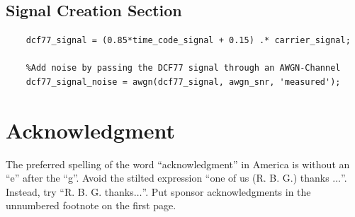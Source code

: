 \documentclass[conference]{IEEEtran}
\begin{document}
\subsection{Signal Creation Section}

\begin{lstlisting}[style=Matlab-editor]
    %Creating the DCF77 signal by using Amplitude Modulation (carrier is reduced to 15% during the gap)
    dcf77_signal = (0.85*time_code_signal + 0.15) .* carrier_signal;
    
    %Add noise by passing the DCF77 signal through an AWGN-Channel
    dcf77_signal_noise = awgn(dcf77_signal, awgn_snr, 'measured');
\end{lstlisting}

\section*{Acknowledgment}
The preferred spelling of the word ``acknowledgment'' in America is without 
an ``e'' after the ``g''. Avoid the stilted expression ``one of us (R. B. 
G.) thanks $\ldots$''. Instead, try ``R. B. G. thanks$\ldots$''. Put sponsor 
acknowledgments in the unnumbered footnote on the first page.
\end{document}
